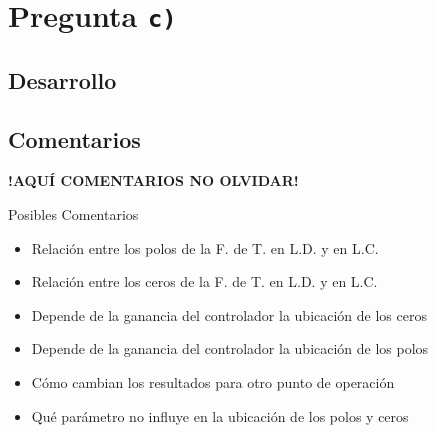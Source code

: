 \section{Pregunta \texttt{c)}}\label{pregunta-c}

\subsection{Desarrollo}

\FloatBarrier
\subsection{Comentarios}


\textbf{!AQUÍ COMENTARIOS NO OLVIDAR!}

Posibles Comentarios
\begin{itemize}
    \item Relación entre los polos de la F. de T. en L.D. y en L.C.
    \item Relación entre los ceros de la F. de T. en L.D. y en L.C.
    \item Depende de la ganancia del controlador la ubicación de los ceros
    \item Depende de la ganancia del controlador la ubicación de los polos
    \item Cómo cambian los resultados para otro punto de operación
    \item Qué parámetro no influye en la ubicación de los polos y ceros
\end{itemize}